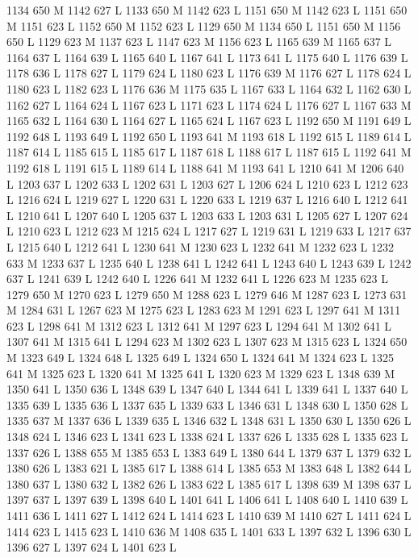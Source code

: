 {{{{{{{{{{{{{{{{{{{{{{{{{{{{{{1134 650 M 1142 627 L
1133 650 M 1142 623 L
1151 650 M 1142 623 L
1151 650 M 1151 623 L
1152 650 M 1152 623 L
1129 650 M 1134 650 L
1151 650 M 1156 650 L
1129 623 M 1137 623 L
1147 623 M 1156 623 L
1165 639 M 1165 637 L
1164 637 L
1164 639 L
1165 640 L
1167 641 L
1173 641 L
1175 640 L
1176 639 L
1178 636 L
1178 627 L
1179 624 L
1180 623 L
1176 639 M 1176 627 L
1178 624 L
1180 623 L
1182 623 L
1176 636 M 1175 635 L
1167 633 L
1164 632 L
1162 630 L
1162 627 L
1164 624 L
1167 623 L
1171 623 L
1174 624 L
1176 627 L
1167 633 M 1165 632 L
1164 630 L
1164 627 L
1165 624 L
1167 623 L
1192 650 M 1191 649 L
1192 648 L
1193 649 L
1192 650 L
1193 641 M 1193 618 L
1192 615 L
1189 614 L
1187 614 L
1185 615 L
1185 617 L
1187 618 L
1188 617 L
1187 615 L
1192 641 M 1192 618 L
1191 615 L
1189 614 L
1188 641 M 1193 641 L
1210 641 M 1206 640 L
1203 637 L
1202 633 L
1202 631 L
1203 627 L
1206 624 L
1210 623 L
1212 623 L
1216 624 L
1219 627 L
1220 631 L
1220 633 L
1219 637 L
1216 640 L
1212 641 L
1210 641 L
1207 640 L
1205 637 L
1203 633 L
1203 631 L
1205 627 L
1207 624 L
1210 623 L
1212 623 M 1215 624 L
1217 627 L
1219 631 L
1219 633 L
1217 637 L
1215 640 L
1212 641 L
1230 641 M 1230 623 L
1232 641 M 1232 623 L
1232 633 M 1233 637 L
1235 640 L
1238 641 L
1242 641 L
1243 640 L
1243 639 L
1242 637 L
1241 639 L
1242 640 L
1226 641 M 1232 641 L
1226 623 M 1235 623 L
1279 650 M 1270 623 L
1279 650 M 1288 623 L
1279 646 M 1287 623 L
1273 631 M 1284 631 L
1267 623 M 1275 623 L
1283 623 M 1291 623 L
1297 641 M 1311 623 L
1298 641 M 1312 623 L
1312 641 M 1297 623 L
1294 641 M 1302 641 L
1307 641 M 1315 641 L
1294 623 M 1302 623 L
1307 623 M 1315 623 L
1324 650 M 1323 649 L
1324 648 L
1325 649 L
1324 650 L
1324 641 M 1324 623 L
1325 641 M 1325 623 L
1320 641 M 1325 641 L
1320 623 M 1329 623 L
1348 639 M 1350 641 L
1350 636 L
1348 639 L
1347 640 L
1344 641 L
1339 641 L
1337 640 L
1335 639 L
1335 636 L
1337 635 L
1339 633 L
1346 631 L
1348 630 L
1350 628 L
1335 637 M 1337 636 L
1339 635 L
1346 632 L
1348 631 L
1350 630 L
1350 626 L
1348 624 L
1346 623 L
1341 623 L
1338 624 L
1337 626 L
1335 628 L
1335 623 L
1337 626 L
1388 655 M 1385 653 L
1383 649 L
1380 644 L
1379 637 L
1379 632 L
1380 626 L
1383 621 L
1385 617 L
1388 614 L
1385 653 M 1383 648 L
1382 644 L
1380 637 L
1380 632 L
1382 626 L
1383 622 L
1385 617 L
1398 639 M 1398 637 L
1397 637 L
1397 639 L
1398 640 L
1401 641 L
1406 641 L
1408 640 L
1410 639 L
1411 636 L
1411 627 L
1412 624 L
1414 623 L
1410 639 M 1410 627 L
1411 624 L
1414 623 L
1415 623 L
1410 636 M 1408 635 L
1401 633 L
1397 632 L
1396 630 L
1396 627 L
1397 624 L
1401 623 L
}}}}}}}}}}}}}}}}}}}}}}}}}}}}}}
